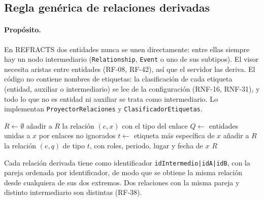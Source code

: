 \subsection{Regla genérica de relaciones derivadas}
\label{sec:alg-derivadas}

\paragraph{Propósito.} En REFRACTS dos entidades nunca se unen directamente: entre ellas siempre hay un nodo intermediario (\texttt{Relationship}, \texttt{Event} o uno de sus subtipos). El visor necesita aristas entre entidades (RF-08, RF-42), así que el servidor las deriva. El código no contiene nombres de etiquetas: la clasificación de cada etiqueta (entidad, auxiliar o intermediario) se lee de la configuración (RNF-16, RNF-31), y todo lo que no es entidad ni auxiliar se trata como intermediario. Lo implementan \texttt{ProyectorRelaciones} y \texttt{ClasificadorEtiquetas}.

\begin{algorithm}[htbp]
  \caption{Relaciones derivadas de una entidad (\texttt{relaciones\_de}).}
  \label{alg:derivadas}
  \begin{algorithmic}[1]
      \State $R \gets \emptyset$
         
          \State añadir a $R$ la relación $(e, x)$ con el tipo del enlace
          \State $Q \gets$ entidades unidas a $x$ por enlaces no ignorados
           
            \State $t \gets$ etiqueta más específica de $x$
              \State añadir a $R$ la relación $(e, q)$ de tipo $t$, con roles, periodo, lugar y fecha de $x$
            \EndFor
          \EndIf
        \EndIf
      \EndFor
      \State \Return $R$
    \EndFunction
  \end{algorithmic}
\end{algorithm}

Cada relación derivada tiene como identificador \texttt{idIntermedio|idA|idB}, con la pareja ordenada por identificador, de modo que se obtiene la misma relación desde cualquiera de sus dos extremos. Dos relaciones con la misma pareja y distinto intermediario son distintas (RF-38).

